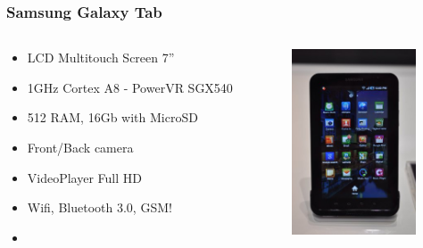 \documentclass{beamer}
\begin{document}
\begin{frame}
\frametitle{Samsung Galaxy Tab}

\begin{columns}
\begin{column}{0.5\textwidth}

\begin{itemize}

\item LCD Multitouch Screen 7''
\item 1GHz Cortex A8 - PowerVR SGX540
\item 512 RAM, 16Gb with MicroSD
\item Front/Back camera
\item VideoPlayer Full HD
\item Wifi, Bluetooth 3.0, GSM!
\item {}
\end{itemize}
\end{column}

\begin{column}{0.5\textwidth}
\begin{center}
  \includegraphics[height=5.5cm]{figs/galaxy-tab}
\end{center}
\end{column}
\end{columns}

\end{frame}
\end{document}
